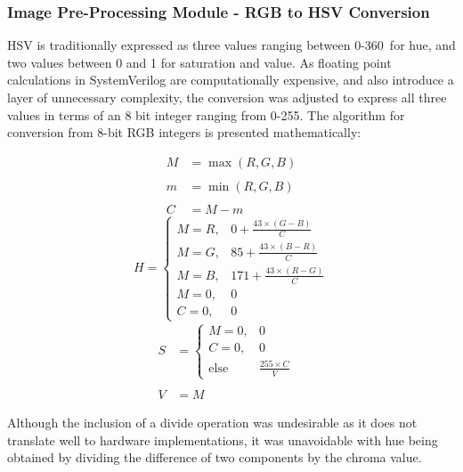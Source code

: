 \documentclass[a4paper]{article}
\begin{document}
\subsubsection{Image Pre-Processing Module - RGB to HSV Conversion} 


HSV is traditionally expressed as three values ranging between 0-360\degree\  
for hue, and two values between 0 and 1 for saturation and value.\cite{10.1145/965139.807361}
As floating point calculations in SystemVerilog are computationally expensive, 
and also introduce a layer of unnecessary complexity, the conversion was adjusted
to express all three values in terms of an 8 bit integer ranging from 0-255. The
algorithm for conversion from 8-bit RGB integers is presented mathematically:

\begin{multicols}{3}
    \noindent
    \begin{align*}
        M &= \max(R, G, B) \\ \\
        m &= \min(R, G, B) \\ \\
        C &= M-m 
    \end{align*}
    \begin{equation*}
        H = \begin{cases}
            M = R, & 0 + \frac{43 \times (G-B)}{C} \\
            M = G, & 85 + \frac{43 \times (B-R)}{C} \\
            M = B, & 171 + \frac{43 \times (R-G)}{C} \\
            M = 0, & 0 \\
            C = 0, & 0
        \end{cases} 
    \end{equation*}
    \begin{align*}
        S &= \begin{cases}
            M = 0, & 0 \\ C = 0, & 0 \\ \text{else} & \frac{255\times C}{V}
        \end{cases} & \\ \\
         V &= M  
    \end{align*}
\end{multicols}



Although the inclusion of a divide operation was undesirable as it does not 
translate well to hardware implementations, it was unavoidable with hue being 
obtained by dividing the difference of two components by the chroma value. 
\end{document}
